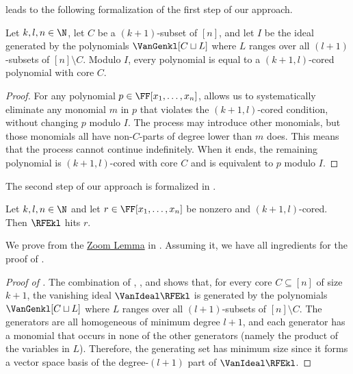  leads to the following formalization of the first step of our approach.

\begin{lemma}
  \label{lem.vangen-coredform}
  Let \(k,l,n\in\N\),
  let \(C\) be a \((k+1)\)-subset of \([n]\), and
  let $I$ be the ideal generated by the
  polynomials \(\VanGenkl[C \sqcup L]\)
  where \(L\) ranges over all \((l+1)\)-subsets of \([n] \setminus C\).
  Modulo $I$,
  every polynomial is equal
  to a \((k+1,l)\)-cored polynomial with core \(C\).
\end{lemma}

\begin{proof}
For any polynomial $p \in \FF[x_1,\dots,x_n]$,  allows us to 
systematically eliminate any monomial $m$ in \(p\) that violates the \((k+1,l)\)-cored condition, without changing $p$ modulo $I$. The process may introduce other monomials, but those monomials all have non-$C$-parts of degree lower than $m$ does. This means that the process cannot continue indefinitely. When it ends, the remaining polynomial is \((k+1,l)\)-cored with core \(C\) and is equivalent to $p$ modulo $I$. 
\end{proof}

The second step of our approach is formalized in .

\begin{lemma}
  \label{lem.rfe-hits-cored}
  Let \(k,l,n\in\N\) and let $r \in \FF[x_1,\dots,x_n]$ be nonzero and \((k+1,l)\)-cored.
  Then \(\RFEkl\) hits \(r\).
\end{lemma}

We prove  from the \hyperref[lem.multi-zsub-deriv]{Zoom Lemma} in . Assuming it, we have all ingredients for the proof of . 

\begin{proof}[Proof of ]
The combination of ,
, and  shows that,
for every core $C \subseteq [n]$ of size $k+1$, the vanishing ideal \(\VanIdeal\RFEkl\) is generated by the
polynomials \(\VanGenkl[C \sqcup L]\) where \(L\) ranges over all \((l+1)\)-subsets of \([n] \setminus C\). The generators are all homogeneous of minimum degree \(l+1\), and each generator has a monomial that occurs in none of the other generators (namely the product of the variables in $L$). Therefore, the generating set has minimum size
since it forms a vector space basis of the degree-\((l+1)\) part of \(\VanIdeal\RFEkl\).
\end{proof}

